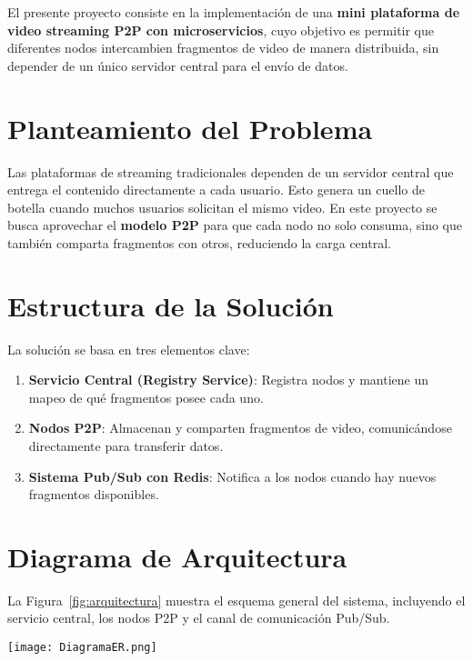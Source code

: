 
El presente proyecto consiste en la implementación de una \textbf{mini plataforma de video streaming P2P con microservicios}, cuyo objetivo es permitir que diferentes nodos intercambien fragmentos de video de manera distribuida, sin depender de un único servidor central para el envío de datos.

\section{Planteamiento del Problema}
Las plataformas de streaming tradicionales dependen de un servidor central que entrega el contenido directamente a cada usuario. Esto genera un cuello de botella cuando muchos usuarios solicitan el mismo video.  
En este proyecto se busca aprovechar el \textbf{modelo P2P} para que cada nodo no solo consuma, sino que también comparta fragmentos con otros, reduciendo la carga central.

\section{Estructura de la Solución}
La solución se basa en tres elementos clave:
\begin{enumerate}
    \item \textbf{Servicio Central (Registry Service)}: Registra nodos y mantiene un mapeo de qué fragmentos posee cada uno.
    \item \textbf{Nodos P2P}: Almacenan y comparten fragmentos de video, comunicándose directamente para transferir datos.
    \item \textbf{Sistema Pub/Sub con Redis}: Notifica a los nodos cuando hay nuevos fragmentos disponibles.
\end{enumerate}

\section{Diagrama de Arquitectura}
La Figura~\ref{fig:arquitectura} muestra el esquema general del sistema, incluyendo el servicio central, los nodos P2P y el canal de comunicación Pub/Sub.

\begin{center}
    \texttt{[image: DiagramaER.png]}
\end{center}
